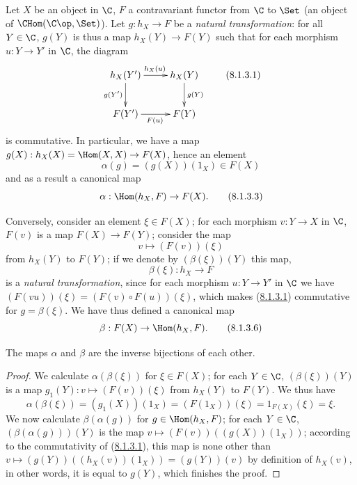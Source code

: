 \begin{env}[8.1.3]
\label{0.8.1.3}
Let $X$ be an object in $\C$, $F$ a contravariant functor from $\C$ to $\Set$
(an object of $\CHom(\C\op,\Set)$). Let $g:h_X\to F$ be a \emph{natural transformation}: for all $Y\in\C$,
$g(Y)$ is thus a map $h_X(Y)\to F(Y)$ such that for each morphism $u:Y\to Y'$ in $\C$,
the diagram
\[
  \xymatrix{
    h_X(Y')\ar[r]^{h_X(u)}\ar[d]_{g(Y')} &
    h_X(Y)\ar[d]^{g(Y)}\\
    F(Y')\ar[r]_{F(u)} &
    F(Y)
  }
  \tag{8.1.3.1}\label{0.8.1.3.1}
\]
is commutative. In particular, we have a map $g(X):h_X(X)=\Hom(X,X)\to F(X)$, hence an element
\[
  \alpha(g)=(g(X))(1_X)\in F(X)
  \tag{8.1.3.2}
\]
and as a result a canonical map
\[
  \alpha:\Hom(h_X,F)\to F(X).
  \tag{8.1.3.3}
\]

Conversely, consider an element $\xi\in F(X)$; for each morphism $v:Y\to X$ in $\C$, $F(v)$ is a
map $F(X)\to F(Y)$; consider the map
\[
  v\mapsto(F(v))(\xi)
  \tag{8.1.3.4}
\]
from $h_X(Y)$ to $F(Y)$; if we denote by $(\beta(\xi))(Y)$ this map,
\[
  \beta(\xi):h_X\to F
  \tag{8.1.3.5}
\]
is a \emph{natural transformation}, since for each morphism $u:Y\to Y'$ in $\C$ we have
$(F(vu))(\xi)=(F(v)\circ F(u))(\xi)$, which makes (\hyperref[0.8.1.3.1]{8.1.3.1}) commutative for $g=\beta(\xi)$.
We have thus defined a canonical map
\[
  \beta:F(X)\to\Hom(h_X,F).
  \tag{8.1.3.6}
\]
\end{env}

\begin{proposition}[8.1.4]
\label{0.8.1.4}
The maps $\alpha$ and $\beta$ are the inverse bijections of each other.
\end{proposition}

\begin{proof}
We calculate $\alpha(\beta(\xi))$ for $\xi\in F(X)$; for each $Y\in\C$, $(\beta(\xi))(Y)$ is a map
$g_1(Y):v\mapsto(F(v))(\xi)$ from $h_X(Y)$ to $F(Y)$. We thus have
\[
  \alpha(\beta(\xi))=(g_1(X))(1_X)=(F(1_X))(\xi)=1_{F(X)}(\xi)=\xi.
\]
We now calculate $\beta(\alpha(g))$ for $g\in\Hom(h_X,F)$; for each $Y\in\C$, $(\beta(\alpha(g)))(Y)$
is the map $v\mapsto(F(v))((g(X))(1_X))$; according to the commutativity of (\hyperref[0.8.1.3.1]{8.1.3.1}), this map
is none other than $v\mapsto(g(Y))((h_X(v))(1_X))=(g(Y))(v)$ by definition of $h_X(v)$, in other words,
it is equal to $g(Y)$, which finishes the proof.
\end{proof}

